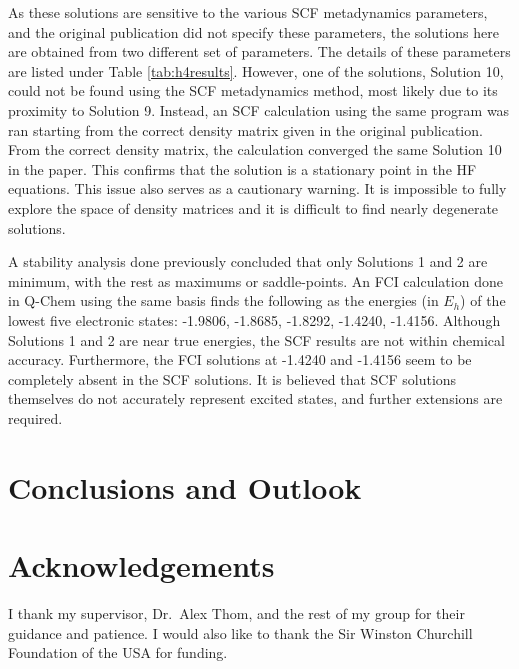 \documentclass[final,3p,times,twocolumn]{elsarticle}
\begin{document}
As these solutions are sensitive to the various SCF metadynamics parameters, and the original publication did not specify these parameters, the solutions here are obtained from two different set of parameters. The details of these parameters are listed under Table \ref{tab:h4results}. However, one of the solutions, Solution 10, could not be found using the SCF metadynamics method, most likely due to its proximity to Solution 9. Instead, an SCF calculation using the same program was ran starting from the correct density matrix given in the original publication. From the correct density matrix, the calculation converged the same Solution 10 in the paper. This confirms that the solution is a stationary point in the HF equations. This issue also serves as a cautionary warning. It is impossible to fully explore the space of density matrices and it is difficult to find nearly degenerate solutions. 

A stability analysis done previously concluded that only Solutions 1 and 2 are minimum, with the rest as maximums or saddle-points. An FCI calculation done in Q-Chem\cite{qchem} using the same basis finds the following as the energies (in $E_h$) of the lowest five electronic states: -1.9806, -1.8685, -1.8292, -1.4240, -1.4156. Although Solutions 1 and 2 are near true energies, the SCF results are not within chemical accuracy. Furthermore, the FCI solutions at -1.4240 and -1.4156 seem to be completely absent in the SCF solutions. It is believed that SCF solutions themselves do not accurately represent excited states, and further extensions are required.

\section{Conclusions and Outlook}
\label{sect:Concl}


\section*{Acknowledgements}
I thank my supervisor, Dr.\ Alex Thom, and the rest of my group for their guidance and patience. I would also like to thank the Sir Winston Churchill Foundation of the USA for funding.





\end{document}
